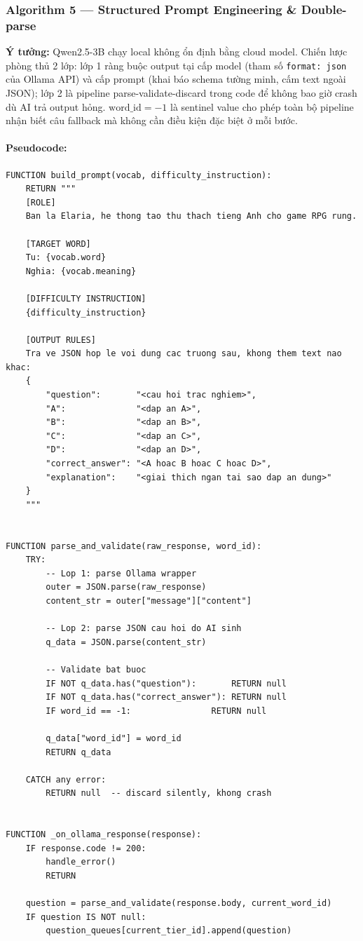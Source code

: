 \subsubsection{Algorithm 5 — Structured Prompt Engineering \& Double-parse}
\textbf{Ý tưởng:} Qwen2.5-3B chạy local không ổn định bằng cloud model. Chiến lược phòng thủ 2 lớp: lớp 1 ràng buộc output tại cấp model (tham số \texttt{format: json} của Ollama API) và cấp prompt (khai báo schema tường minh, cấm text ngoài JSON); lớp 2 là pipeline parse-validate-discard trong code để không bao giờ crash dù AI trả output hỏng. $\text{word\_id} = -1$ là sentinel value cho phép toàn bộ pipeline nhận biết câu fallback mà không cần điều kiện đặc biệt ở mỗi bước.

\paragraph{Pseudocode:}
\begin{lstlisting}
FUNCTION build_prompt(vocab, difficulty_instruction):
    RETURN """
    [ROLE]
    Ban la Elaria, he thong tao thu thach tieng Anh cho game RPG rung.

    [TARGET WORD]
    Tu: {vocab.word}
    Nghia: {vocab.meaning}

    [DIFFICULTY INSTRUCTION]
    {difficulty_instruction}

    [OUTPUT RULES]
    Tra ve JSON hop le voi dung cac truong sau, khong them text nao khac:
    {
        "question":       "<cau hoi trac nghiem>",
        "A":              "<dap an A>",
        "B":              "<dap an B>",
        "C":              "<dap an C>",
        "D":              "<dap an D>",
        "correct_answer": "<A hoac B hoac C hoac D>",
        "explanation":    "<giai thich ngan tai sao dap an dung>"
    }
    """


FUNCTION parse_and_validate(raw_response, word_id):
    TRY:
        -- Lop 1: parse Ollama wrapper
        outer = JSON.parse(raw_response)
        content_str = outer["message"]["content"]

        -- Lop 2: parse JSON cau hoi do AI sinh
        q_data = JSON.parse(content_str)

        -- Validate bat buoc
        IF NOT q_data.has("question"):       RETURN null
        IF NOT q_data.has("correct_answer"): RETURN null
        IF word_id == -1:                RETURN null

        q_data["word_id"] = word_id
        RETURN q_data

    CATCH any error:
        RETURN null  -- discard silently, khong crash


FUNCTION _on_ollama_response(response):
    IF response.code != 200:
        handle_error()
        RETURN

    question = parse_and_validate(response.body, current_word_id)
    IF question IS NOT null:
        question_queues[current_tier_id].append(question)
\end{lstlisting}

